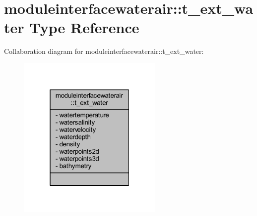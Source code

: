 \hypertarget{structmoduleinterfacewaterair_1_1t__ext__water}{}\section{moduleinterfacewaterair\+:\+:t\+\_\+ext\+\_\+water Type Reference}
\label{structmoduleinterfacewaterair_1_1t__ext__water}


Collaboration diagram for moduleinterfacewaterair\+:\+:t\+\_\+ext\+\_\+water\+:\nopagebreak
\begin{figure}[H]
\begin{center}
\leavevmode
\includegraphics[width=199pt]{structmoduleinterfacewaterair_1_1t__ext__water__coll__graph}
\end{center}
\end{figure}
